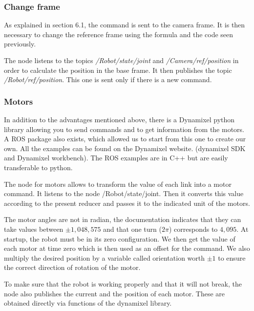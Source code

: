 \subsubsection{Change frame}

As explained in section 6.1, the command is sent to the camera frame. It is then necessary to change the reference frame using the formula and the code seen previously. 

\bigbreak
The node listens to the topics \textit{/Robot/state/joint} and \textit{/Camera/ref/position} in order to calculate the position in the base frame. It then publishes the topic \textit{/Robot/ref/position}. This one is sent only if there is a new command.

\subsubsection{Motors}

In addition to the advantages mentioned above, there is a Dynamixel python library allowing you to send commands and to get information from the motors. A ROS package also exists, which allowed us to start from this one to create our own. All the examples can be found on the Dynamixel website. (dynamixel SDK and Dynamixel workbench). The ROS examples are in C++ but are easily transferable to python.

\bigbreak
The node for motors allows to transform the value of each link into a motor command. It listens to the node /Robot/state/joint. Then it converts this value according to the present reducer and passes it to the indicated unit of the motors.

\bigbreak
The motor angles are not in radian, the documentation indicates that they can take values between $\pm1,048,575$ and that one turn ($2\pi$) corresponds to $4,095$. At startup, the robot must be in its zero configuration. We then get the value of each motor at time zero which is then used as an offset for the command. We also multiply the desired position by a variable called orientation worth $\pm1$ to ensure the correct direction of rotation of the motor.

\bigbreak
To make sure that the robot is working properly and that it will not break, the node also publishes the current and the position of each motor. These are obtained directly via functions of the dynamixel library.

